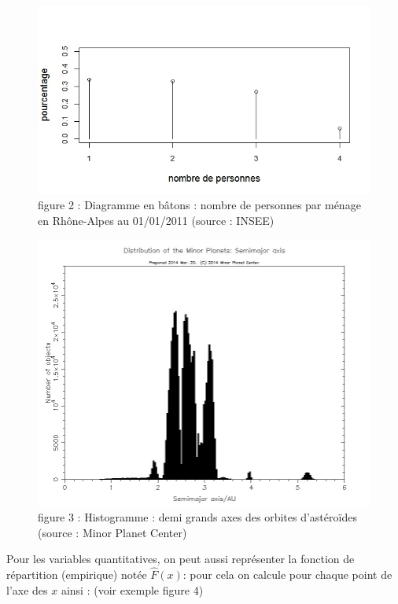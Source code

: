 \documentclass[]{book}
\theoremstyle{definition}
\theoremstyle{definition}
\theoremstyle{remark}
\begin{document}
\begin{figure}[htbp]
\centering
\includegraphics{./figures/figure2.jpg}
\caption{figure 2 : Diagramme en bâtons : nombre de personnes par ménage
en Rhône-Alpes au 01/01/2011 (source : INSEE)}
\end{figure}

\begin{figure}[htbp]
\centering
\includegraphics{./figures/figure3.jpg}
\caption{figure 3 : Histogramme : demi grands axes des orbites
d'astéroïdes (source : Minor Planet Center)}
\end{figure}

Pour les variables quantitatives, on peut aussi représenter la fonction
de répartition (empirique) notée \(\hat{F}(x)\): pour cela on calcule
pour chaque point de l'axe des \(x\) ainsi : (voir exemple figure 4)
\end{document}
